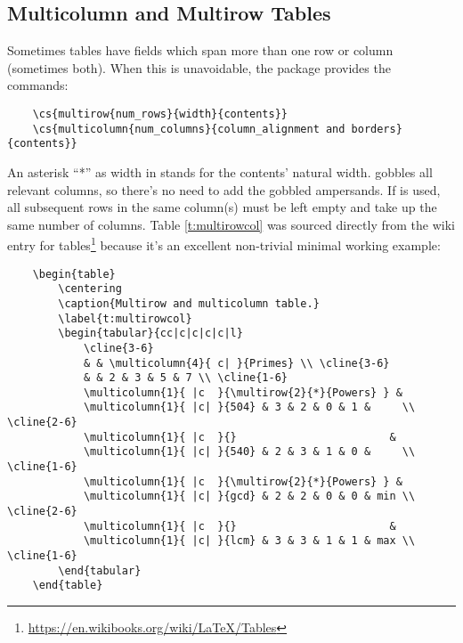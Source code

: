 \subsection{Multicolumn and Multirow Tables}
%
Sometimes tables have fields which span more than one row or column
(sometimes both).  When this is unavoidable, the 
package provides the commands:
\begin{verbatim}
	\cs{multirow{num_rows}{width}{contents}}
	\cs{multicolumn{num_columns}{column_alignment and borders}{contents}}
\end{verbatim}
An asterisk ``*'' as width in  stands for the
contents' natural width.   gobbles all relevant
columns, so there's no need to add the gobbled ampersands.  If
 is used, all subsequent rows in the same column(s)
must be left empty and take up the same number of columns.  Table
\ref{t:multirowcol} was sourced directly from the wiki entry for
tables\footnote{\url{https://en.wikibooks.org/wiki/LaTeX/Tables}}
because it's an excellent non-trivial minimal working example:
\begin{verbatim}
	\begin{table}
	    \centering
	    \caption{Multirow and multicolumn table.}
	    \label{t:multirowcol}
	    \begin{tabular}{cc|c|c|c|c|l}
	        \cline{3-6}
	        & & \multicolumn{4}{ c| }{Primes} \\ \cline{3-6}
	        & & 2 & 3 & 5 & 7 \\ \cline{1-6}
	        \multicolumn{1}{ |c  }{\multirow{2}{*}{Powers} } &
	        \multicolumn{1}{ |c| }{504} & 3 & 2 & 0 & 1 &     \\ \cline{2-6}
	        \multicolumn{1}{ |c  }{}                        &
	        \multicolumn{1}{ |c| }{540} & 2 & 3 & 1 & 0 &     \\ \cline{1-6}
	        \multicolumn{1}{ |c  }{\multirow{2}{*}{Powers} } &
	        \multicolumn{1}{ |c| }{gcd} & 2 & 2 & 0 & 0 & min \\ \cline{2-6}
	        \multicolumn{1}{ |c  }{}                        &
	        \multicolumn{1}{ |c| }{lcm} & 3 & 3 & 1 & 1 & max \\ \cline{1-6}
	    \end{tabular}
	\end{table}
\end{verbatim}
